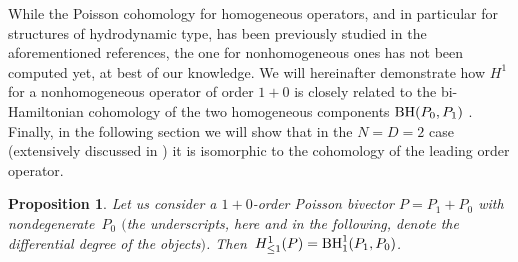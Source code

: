 \documentclass[10pt,a4paper]{amsart}
\numberwithin{equation}{section}
\newtheorem{Proposition}[Theorem]{Proposition}
 { \theoremstyle{definition}
\newtheorem{Definition}[Theorem]{Definition}
\newtheorem{Note}[Theorem]{Note}
\newtheorem{Example}[Theorem]{Example}
\newtheorem{Remark}[Theorem]{Remark} }
\begin{document}
While the Poisson cohomology for homogeneous operators, and in particular for structures of hydrodynamic type, has been previously studied in the aforementioned references, the one for nonhomogeneous ones has not been computed yet, at best of our knowledge. We will hereinafter demonstrate how $H^1$ for a nonhomogeneous operator of order $1{+}0$ is closely related to the bi-Hamiltonian cohomology of the two homogeneous components ${\rm BH}(P_0,P_1)$ \cite{lz05}. Finally, in the following section we will show that in the $N=D=2$ case (extensively discussed in \cite{casati2015deformations}) it is isomorphic to the cohomology of the leading order operator.
\begin{Proposition}\label{prop:biham}
Let us consider a $1{+}0$-order Poisson bivector $P=P_1+P_0$ with nondegenerate~$P_0$ $($the underscripts, here and in the following, denote the \emph{differential degree} of the objects$)$. Then~${H^1_{\leq 1}(P)={\rm BH}^1_{1}(P_1,P_0)}$.
\end{Proposition}
\end{document}

